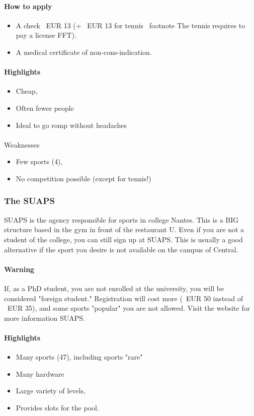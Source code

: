 \paragraph{How to apply}
\begin{itemize}
  \item A check \ EUR {13} (+ \ EUR {13} for tennis \ footnote {The tennis requires to pay a license FFT}).
  \item A medical certificate of non-cons-indication.
\end{itemize}

\paragraph{Highlights}
\begin{itemize}
  \item Cheap,
  \item Often fewer people
  \item Ideal to go romp without headaches
\end{itemize}
\paragraph{} Weaknesses
\begin{itemize}
  \item Few sports (4),
  \item No competition possible (except for tennis!)
\end{itemize}

\subsubsection {The SUAPS}
SUAPS is the agency responsible for sports in college Nantes.
This is a BIG structure based in the gym in front of the restaurant U.
Even if you are not a student of the college, you can still sign up at SUAPS.
This is usually a good alternative if the sport you desire is not available on the campus of Central.

\paragraph{Warning} If, as a PhD student, you are not enrolled at the university, you will be considered "foreign student."
Registration will cost more (\ EUR {50} instead of \ EUR {35}), and some sports "popular" you are not allowed.
Visit the website for more information SUAPS.

\paragraph{Highlights}
\begin{itemize}
  \item Many sports (47), including sports "rare"
  \item Many hardware
  \item Large variety of levels,
  \item Provides slots for the pool.
\end{itemize}
